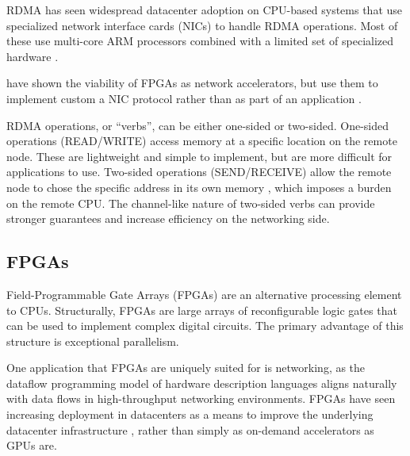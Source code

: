 RDMA has seen widespread datacenter adoption \autocite{strom} on CPU-based systems that use specialized network interface cards (NICs) to handle RDMA operations. Most of these use multi-core ARM processors combined with a limited set of specialized hardware \autocite{strom}.

\citeauthor{star} have shown the viability of FPGAs as network accelerators, but use them to implement custom a NIC protocol rather than as part of an application \autocite{star}.

RDMA operations, or ``verbs'', can be either one-sided or two-sided. One-sided operations (READ/WRITE) access memory at a specific location on the remote node. These are lightweight and simple to implement, but are more difficult for applications to use. Two-sided operations (SEND/RECEIVE) allow the remote node to chose the specific address in its own memory \autocite{base}, which imposes a burden on the remote CPU. The channel-like nature of two-sided verbs can provide stronger guarantees and increase efficiency on the networking side.


\subsection{FPGAs}

Field-Programmable Gate Arrays (FPGAs) are an alternative processing element to CPUs. Structurally, FPGAs are large arrays of reconfigurable logic gates that can be used to implement complex digital circuits. The primary advantage of this structure is exceptional parallelism.

One application that FPGAs are uniquely suited for is networking, as the dataflow programming model of hardware description languages aligns naturally with data flows in high-throughput networking environments.
FPGAs have seen increasing deployment in datacenters as a means to improve the underlying datacenter infrastructure \autocites{bobda-trets-2022}{fang-vldb-2020}, rather than simply as on-demand accelerators as GPUs are.


